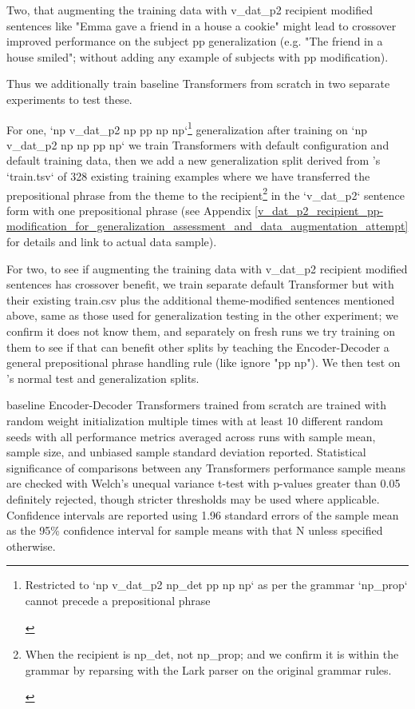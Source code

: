 \documentclass[11pt]{article}
\begin{document}
Two, that augmenting the training data with v\_dat\_p2 recipient modified sentences like "Emma gave a friend in a house a cookie" might lead to crossover improved performance on the subject pp generalization (e.g. "The friend in a house smiled"; without adding any example of subjects with pp modification).

Thus we additionally train \cite{Wu2023} baseline Transformers from scratch in two separate experiments to test these.

For one, `np v\_dat\_p2 np pp np np`\footnote{\begin{footnotesize}Restricted to `np v\_dat\_p2 np\_det pp np np` as per the grammar `np\_prop` cannot precede a prepositional phrase\end{footnotesize}} generalization after training on `np v\_dat\_p2 np np pp np` we train \cite{Wu2023} Transformers with default configuration and default training data, then we add a new generalization split derived from \cite{Wu2023}'s `train.tsv` of 328 existing training examples where we have transferred the prepositional phrase from the theme to the recipient\footnote{\begin{footnotesize}When the recipient is np\_det, not np\_prop; and we confirm it is within the grammar by reparsing with the Lark parser on the original grammar rules.\end{footnotesize}} in the `v\_dat\_p2` sentence form with one prepositional phrase (see Appendix \ref{v_dat_p2_recipient_pp-modification_for_generalization_assessment_and_data_augmentation_attempt} for details and link to actual data sample).

For two, to see if augmenting the training data with v\_dat\_p2 recipient modified sentences has crossover benefit, we train separate default \cite{Wu2023} Transformer but with their existing train.csv plus the additional theme-modified sentences mentioned above, same as those used for generalization testing in the other experiment; we confirm it does not know them, and separately on fresh runs we try training on them to see if that can benefit other splits by teaching the Encoder-Decoder a general prepositional phrase handling rule (like ignore "pp np"). We then test on \cite{Wu2023}'s normal test and generalization splits.

\cite{Wu2023} baseline Encoder-Decoder Transformers trained from scratch are trained with random weight initialization multiple times with at least 10 different random seeds with all performance metrics averaged across runs with sample mean, sample size, and unbiased sample standard deviation reported. Statistical significance of comparisons between any Transformers performance sample means are checked with Welch's unequal variance t-test with p-values greater than 0.05 definitely rejected, though stricter thresholds may be used where applicable. Confidence intervals are reported using 1.96 standard errors of the sample mean as the 95\% confidence interval for sample means with that N unless specified otherwise.
\end{document}
